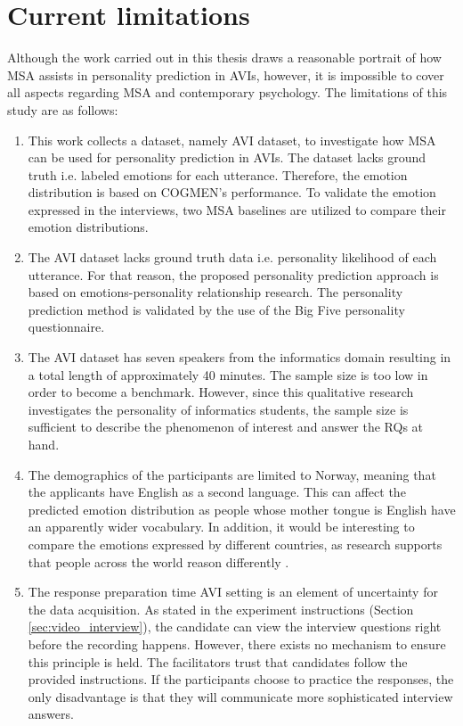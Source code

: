 \section{Current limitations}
\label{sec:current_limitations}
Although the work carried out in this thesis draws a reasonable portrait of how MSA assists in personality prediction in AVIs, however, it is impossible to cover all aspects regarding MSA and contemporary psychology. The limitations of this study are as follows:
%
\begin{enumerate}
    \item This work collects a dataset, namely AVI dataset, to investigate how MSA can be used for personality prediction in AVIs. The dataset lacks ground truth i.e. labeled emotions for each utterance. Therefore, the emotion distribution is based on COGMEN's performance. To validate the emotion expressed in the interviews, two MSA baselines are utilized to compare their emotion distributions. \\
    \item The AVI dataset lacks ground truth data i.e. personality likelihood of each utterance. For that reason, the proposed personality prediction approach is based on emotions-personality relationship research. The personality prediction method is validated by the use of the Big Five personality questionnaire. \\
    \item The AVI dataset has seven speakers from the informatics domain resulting in a total length of approximately 40 minutes. The sample size is too low in order to become a benchmark. However, since this qualitative research investigates the personality of informatics students, the sample size is sufficient to describe the phenomenon of interest and answer the RQs at hand. \\
    \item The demographics of the participants are limited to Norway, meaning that the applicants have English as a second language. This can affect the predicted emotion distribution as people whose mother tongue is English have an apparently wider vocabulary. In addition, it would be interesting to compare the emotions expressed by different countries, as research supports that people across the world reason differently \cite{reason_differently_johnson2006there}. \\
    \item The response preparation time AVI setting is an element of uncertainty for the data acquisition. As stated in the experiment instructions (Section \ref{sec:video_interview}), the candidate can view the interview questions right before the recording happens. However, there exists no mechanism to ensure this principle is held. The facilitators trust that candidates follow the provided instructions. If the participants choose to practice the responses, the only disadvantage is that they will communicate more sophisticated interview answers. \\

\end{enumerate}
